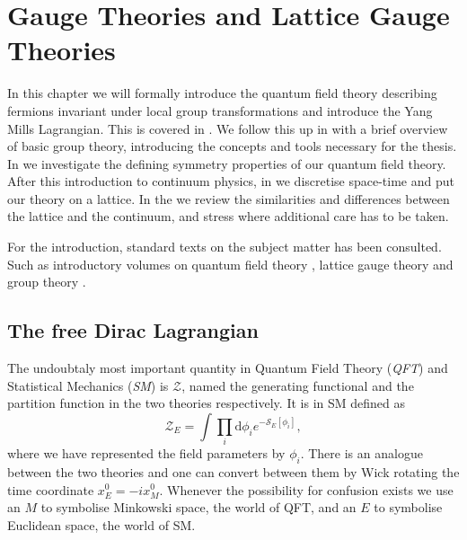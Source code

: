 \chapter{Gauge Theories and Lattice Gauge Theories}

In this chapter we will formally introduce the quantum field theory describing
fermions invariant under local group transformations and introduce the Yang
Mills Lagrangian. This is covered in . We follow
this up in  with a brief overview of basic group theory,
introducing the concepts and tools necessary for the thesis. In
 we investigate the defining symmetry properties of our
quantum field theory. After this introduction to continuum physics, in
 we discretise space-time and put our theory on a
lattice. In the 
we review the similarities and differences between the lattice and the
continuum, and stress where additional care has to be taken.

For the introduction, standard texts on the subject matter has been consulted.
Such as introductory volumes on quantum field theory
\citep[e.g.][]{peskin1995introduction,maggiore2004modern}, lattice gauge theory
\citep[e.g.][]{montvay1997quantum,gattringer2009quantum} and group theory
\citep[e.g.][]{georgi1999lie,fulton2013representation}.

\section{The free Dirac Lagrangian} \label{sec:continuum_gauge}

The undoubtaly most important quantity in Quantum Field Theory (\emph{QFT}) and
Statistical Mechanics (\emph{SM}) is $\mathcal{Z}$, named the generating
functional and the partition function in the two theories respectively. It is in
SM defined as
%
\begin{equation}
  \mathcal{Z}_E = \int \prod_i \mathrm{d} \phi_i e^{-\mathcal{S}_E[\phi_i]},
\end{equation}
%
where we have represented the field parameters by $\phi_i$. There is an analogue
between the two theories and one can convert between them by Wick rotating the
time coordinate $x^0_E = -i x^0_M$. Whenever the possibility for confusion
exists we use an $M$ to symbolise Minkowski space, the world of QFT, and an $E$
to symbolise Euclidean space, the world of SM.

